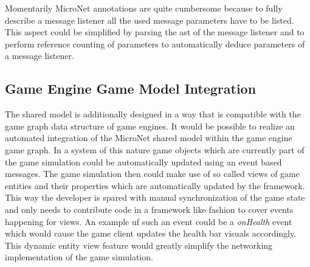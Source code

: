 Momentarily MicroNet annotations are quite cumbersome because to fully describe
a message listener all the used message parameters have to be listed.
This aspect could be simplified by parsing the \gls{ast} of the message listener
and to perform reference counting of parameters to automatically deduce
parameters of a message listener.

\subsection{Game Engine Game Model Integration}

The shared model is additionally designed in a way that is compatible with the
game graph data structure of game engines. It would be possible to realize an
automated integration of the MicroNet shared model within the game engine game
graph. In a system of this nature game objects which are currently part of the
game simulation could be automatically updated using an event based messages.
The game simulation then could make use of so called views of game entities and
their properties which are automatically updated by the framework. This way the
developer is spared with manual synchronization of the game state and only needs
to contribute code in a framework like fashion to cover events happening for
views. An example uf such an event could be a \textit{onHealth} event which
would cause the game client updates the health bar visuals accordingly. This
dynamic entity view feature would greatly simplify the networking implementation
of the game simulation.
